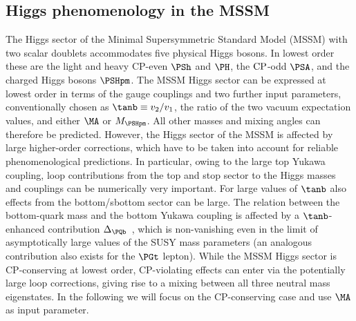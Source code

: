 \subsection{Higgs phenomenology in the MSSM}
\label{sec:mssmvssm}

The Higgs sector of the Minimal Supersymmetric Standard Model (MSSM)
with two scalar doublets accommodates five physical Higgs bosons. In
lowest order these are the light and heavy CP-even $\PSh$ and $\PH$, the
$\mathrm{CP}$-odd $\PSA$, and the charged Higgs bosons $\PSHpm$.  The MSSM Higgs
sector can be expressed at lowest order in terms of the gauge couplings
and two further input parameters, conventionally chosen as $\tanb \equiv
v_2/v_1$, the ratio of the two vacuum expectation values, and either
$\MA$ or $M_{\PSHpm}$. All other masses and mixing angles can therefore be
predicted. However, the Higgs sector of the MSSM is affected by large
higher-order corrections, which have to be taken into account for
reliable phenomenological predictions. In particular, owing to the large
top Yukawa coupling, loop contributions from the top and stop sector to
the Higgs masses and couplings can be numerically very important. For
large values of $\tanb$ also effects from the bottom/sbottom sector can
be large. The relation between the bottom-quark mass and the bottom
Yukawa coupling is affected by a $\tanb$-enhanced contribution
$\Delta_{\PQb}$~\cite{Hall:1993gn,Hempfling:1993kv,
Carena:1994bv,Pierce:1996zz,Carena:1999py,Guasch:2003cv,Noth:2008tw,Noth:2010jy,Mihaila:2010mp,Hofer:2009xb}, which is
non-vanishing even in the limit of asymptotically large values of the
SUSY mass parameters (an analogous contribution also exists for the
$\PGt$ lepton).  While the MSSM Higgs sector is CP-conserving at lowest
order, CP-violating effects can enter via the potentially large loop
corrections, giving rise to a mixing between all three neutral mass
eigenstates. In the following we will focus on the CP-conserving case
and use $\MA$ as input parameter. 

